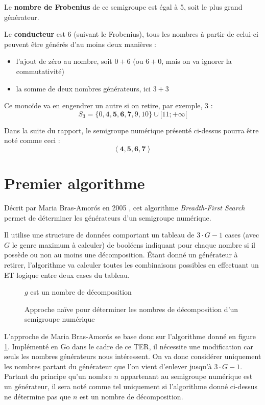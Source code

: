 \documentclass[12pt,a4paper]{report}
\newcommand{\gen}[1]{\left<#1\right>}
\begin{document}
Le \textbf{nombre de Frobenius} de ce semigroupe est égal à 5, soit le plus grand générateur.

Le \textbf{conducteur} est 6 (suivant le Frobenius), tous les nombres à partir de celui-ci peuvent être générés d'au moins deux manières :
\begin{itemize}
	\item	l'ajout de zéro au nombre, soit $0 + 6$ (ou $6 + 0$, mais on va ignorer la commutativité)
	\item	la somme de deux nombres générateurs, ici $3 + 3$
\end{itemize}

Ce monoïde va en engendrer un autre si on retire, par exemple, 3 :
\[ S_3 = \{ 0, \mathbf{4}, \mathbf{5}, \mathbf{6}, \mathbf{7}, 9, 10 \} \cup [11; +\infty[ \]

Dans la suite du rapport, le semigroupe numérique présenté ci-dessus pourra être noté comme ceci :
\[ \gen{\mathbf{4}, \mathbf{5}, \mathbf{6}, \mathbf{7}} \]

\section{Premier algorithme}
Décrit par Maria Bras-Amorós en 2005 \cite{ba2005}, cet algorithme \emph{Breadth-First Search} permet de déterminer les générateurs d'un semigroupe numérique.

Il utilise une structure de données comportant un tableau de $3 \cdot G - 1$ cases (avec $G$ le genre maximum à calculer) de booléens indiquant pour chaque nombre si il possède ou non au moins une décomposition. Étant donné un générateur à retirer, l'algorithme va calculer toutes les combinaisons possibles en effectuant un ET logique entre deux cases du tableau.

\begin{figure}[h]
  \begin{algorithmic}
	    \STATE $g$ est un nombre de décomposition
	  \ENDIF
	\ENDFOR
      \ENDIF
    \ENDFOR
  \end{algorithmic}
  \caption{Approche naïve pour déterminer les nombres de décomposition d'un semigroupe numérique}
  \label{fig:nalg}
\end{figure}

L'approche de Maria Bras-Amorós se base donc sur l'algorithme donné en figure \ref{fig:nalg}. Implémenté en Go dans le cadre de ce TER, il nécessite une modification car seuls les nombres générateurs nous intéressent. On va donc considérer uniquement les nombres partant du générateur que l'on vient d'enlever jusqu'à $3 \cdot G - 1$. Partant du principe qu'un nombre $n$ appartenant au semigroupe numérique est un générateur, il sera noté comme tel uniquement si l'algorithme donné ci-dessus ne détermine pas que $n$ est un nombre de décomposition.
\end{document}
